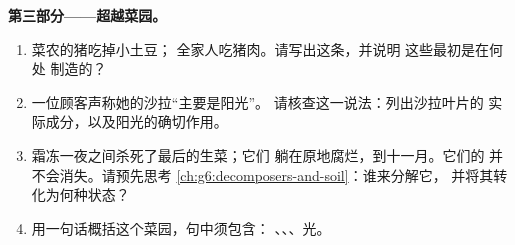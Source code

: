 \begin{problem}
\medskip\noindent\textbf{第三部分——超越菜园。}
\begin{enumerate}[resume]
  \item 菜农的猪吃掉小土豆；
        全家人吃猪肉。请写出这条，并说明
        这些最初是在何处
        制造的？
  \item 一位顾客声称她的沙拉“主要是阳光”。
        请核查这一说法：列出沙拉叶片的
        实际成分，以及阳光的确切作用。
  \item 霜冻一夜之间杀死了最后的生菜；它们
        躺在原地腐烂，到十一月。它们的
        并不会消失。请预先思考
        \cref{ch:g6:decomposers-and-soil}：谁来分解它，
        并将其转化为何种状态？
  \item 用一句话概括这个菜园，句中须包含：
        、、、光。
\end{enumerate}
\end{problem}
